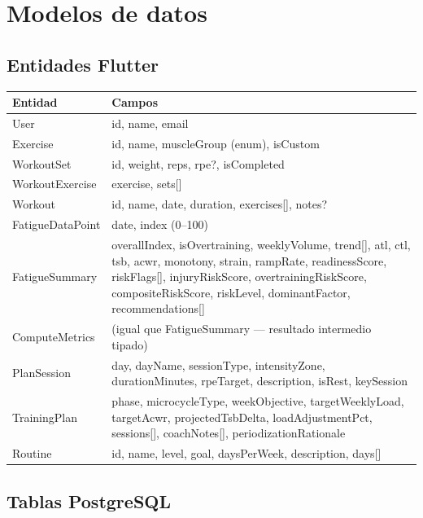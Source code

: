 \documentclass[12pt, a4paper]{article}
\begin{document}
\section{Modelos de datos}

\subsection{Entidades Flutter}

\begin{longtable}{>{\ttfamily}p{4.5cm} p{9.5cm}}
  \toprule
  Entidad & Campos \\
  \midrule
  \endhead
  User            & id, name, email \\
  Exercise        & id, name, muscleGroup (enum), isCustom \\
  WorkoutSet      & id, weight, reps, rpe?, isCompleted \\
  WorkoutExercise & exercise, sets[] \\
  Workout         & id, name, date, duration, exercises[], notes? \\
  FatigueDataPoint & date, index (0--100) \\
  FatigueSummary  & overallIndex, isOvertraining, weeklyVolume, trend[],
                    atl, ctl, tsb, acwr, monotony, strain, rampRate,
                    readinessScore, riskFlags[], injuryRiskScore,
                    overtrainingRiskScore, compositeRiskScore,
                    riskLevel, dominantFactor, recommendations[] \\
  ComputeMetrics  & (igual que FatigueSummary --- resultado intermedio tipado) \\
  PlanSession     & day, dayName, sessionType, intensityZone,
                    durationMinutes, rpeTarget, description, isRest, keySession \\
  TrainingPlan    & phase, microcycleType, weekObjective, targetWeeklyLoad,
                    targetAcwr, projectedTsbDelta, loadAdjustmentPct,
                    sessions[], coachNotes[], periodizationRationale \\
  Routine         & id, name, level, goal, daysPerWeek, description, days[] \\
  \bottomrule
\end{longtable}

\subsection{Tablas PostgreSQL}
\end{document}
